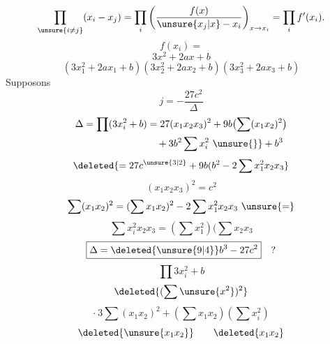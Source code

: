 
\[
\prod_{\unsure{i\ne j}}(x_i-x_j)=\prod_i\left(\frac{f(x)}{\unsure{x_j|x}-x_i}\right)_{x\to x_i}=\prod_i f'(x_i).
\]
\[
f(x_i)=
\]
\[
3x^2+2ax+b
\]
\[
(3x_1^2+2ax_1+b)(3x_2^2+2ax_2+b)(3x_3^2+2ax_3+b)
\]
Supposons  
\[
j=-\frac{27c^2}{\Delta}
\]
\[
\begin{aligned}
\Delta=\prod(3x_i^2+b)&=27(x_1x_2x_3)^2+9b\bigl(\sum(x_1x_2)^2\bigr)\\
&\quad+3b^2\sum x_i^2\ \unsure{\}}+b^3
\end{aligned}
\]
\[
\deleted{=27c^{\unsure{3|2}}+9b(b^2-2\sum x_1^2x_2x_3}
\]
\[
(x_1x_2x_3)^2=c^2
\]
\[
\sum(x_1x_2)^2=(\sum x_1x_2)^2-2\sum x_1^2x_2x_3\ \unsure{=}
\]
\[
\sum x_i^2x_2x_3=(\sum x_1^2)(\sum x_2x_3
\]
\[
\boxed{\Delta=\deleted{\unsure{9|4}}b^3-27c^2}\quad ?
\]
\[
\prod 3x_i^2+b
\]
\[
\deleted{(\sum\unsure{x^2})^2}
\]
\[
\cdot\ 3\sum(x_1x_2)^2+(\sum x_1x_2)(\sum x_i^2)
\]
\[
\deleted{\unsure{x_1x_2}}\qquad\deleted{x_1x_2}
\]
